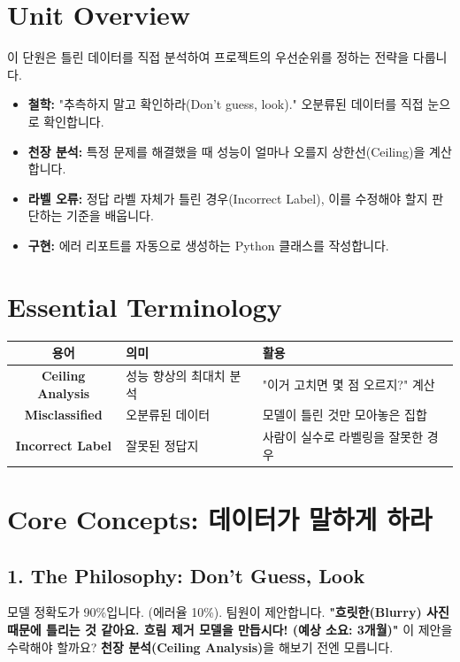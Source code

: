 \documentclass[11pt,a4paper]{book}
\theoremstyle{definition}
\begin{document}
\section{Unit Overview}
\begin{summarybox}[title={핵심 목표}]
이 단원은 틀린 데이터를 직접 분석하여 프로젝트의 우선순위를 정하는 전략을 다룹니다.
\begin{itemize}
    \item \textbf{철학:} "추측하지 말고 확인하라(Don't guess, look)." 오분류된 데이터를 직접 눈으로 확인합니다.
    \item \textbf{천장 분석:} 특정 문제를 해결했을 때 성능이 얼마나 오를지 상한선(Ceiling)을 계산합니다.
    \item \textbf{라벨 오류:} 정답 라벨 자체가 틀린 경우(Incorrect Label), 이를 수정해야 할지 판단하는 기준을 배웁니다.
    \item \textbf{구현:} 에러 리포트를 자동으로 생성하는 Python 클래스를 작성합니다.
\end{itemize}
\end{summarybox}

\section{Essential Terminology}
\begin{center}
\begin{tabular}{|c|l|l|}
\hline
\textbf{용어} & \textbf{의미} & \textbf{활용} \\ \hline
\textbf{Ceiling Analysis} & 성능 향상의 최대치 분석 & "이거 고치면 몇 점 오르지?" 계산 \\ \hline
\textbf{Misclassified} & 오분류된 데이터 & 모델이 틀린 것만 모아놓은 집합 \\ \hline
\textbf{Incorrect Label} & 잘못된 정답지 & 사람이 실수로 라벨링을 잘못한 경우 \\ \hline
\end{tabular}
\end{center}

\section{Core Concepts: 데이터가 말하게 하라}

\subsection{1. The Philosophy: Don't Guess, Look}
모델 정확도가 90\%입니다. (에러율 10\%).
팀원이 제안합니다. \textbf{"흐릿한(Blurry) 사진 때문에 틀리는 것 같아요. 흐림 제거 모델을 만듭시다! (예상 소요: 3개월)"}
이 제안을 수락해야 할까요? \textbf{천장 분석(Ceiling Analysis)}을 해보기 전엔 모릅니다.
\end{document}
